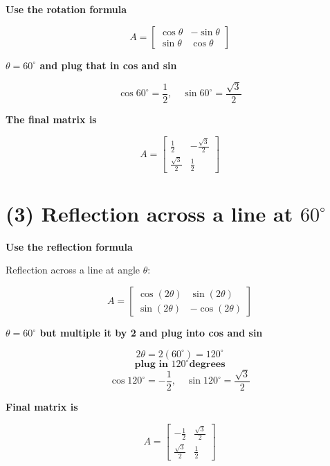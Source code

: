 \documentclass{ximera}
\begin{document}
\textbf{ Use the rotation formula}

\[
A =
\begin{bmatrix}
\cos \theta & -\sin \theta \\
\sin \theta & \cos \theta
\end{bmatrix}
\]

\textbf{ $\theta = 60^\circ$ and plug that in cos and sin}

\[
\cos 60^\circ = \frac{1}{2}, \quad \sin 60^\circ = \frac{\sqrt{3}}{2}
\]

\textbf{The final matrix is}

\[
A =
\begin{bmatrix}
\frac{1}{2} & -\frac{\sqrt{3}}{2} \\
\frac{\sqrt{3}}{2} & \frac{1}{2}
\end{bmatrix}
\]

\section*{(3) Reflection across a line at $60^\circ$}

\textbf{Use the reflection formula}

Reflection across a line at angle $\theta$:

\[
A =
\begin{bmatrix}
\cos(2\theta) & \sin(2\theta) \\
\sin(2\theta) & -\cos(2\theta)
\end{bmatrix}
\]

\textbf{ $\theta = 60^\circ$ but multiple it by 2 and plug into cos and sin}

\[
2\theta = 2(60^\circ) = 120^\circ
\]
\[
\textbf{plug in } 120^\circ \textbf{degrees}
\]
\[
\cos 120^\circ = -\frac{1}{2}, \quad \sin 120^\circ = \frac{\sqrt{3}}{2}
\]

\textbf{Final matrix is}

\[
A =
\begin{bmatrix}
-\frac{1}{2} & \frac{\sqrt{3}}{2} \\
\frac{\sqrt{3}}{2} & \frac{1}{2}
\end{bmatrix}
\]
\end{document}
